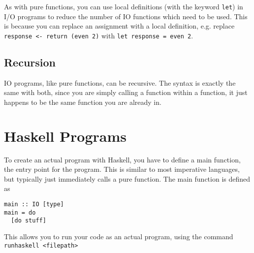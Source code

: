 As with pure functions, you can use local definitions (with the keyword \verb`let`) in I/O programs to reduce the number
 of IO functions which need to be used. This is because you can replace an assignment with a local definition, e.g. replace
 \verb`response <- return (even 2)` with \verb`let response = even 2`.

\subsection*{Recursion}

IO programs, like pure functions, can be recursive. The syntax is exactly the same with both, since you are simply
 calling a function within a function, it just happens to be the same function you are already in.

\section*{Haskell Programs}

To create an actual program with Haskell, you have to define a main function, the entry point for the program. This is
 similar to most imperative languages, but typically just immediately calls a pure function. The main function is defined
 as
\begin{verbatim}
main :: IO [type]
main = do
  [do stuff]
\end{verbatim}
This allows you to run your code as an actual program, using the command \verb`runhaskell <filepath>`